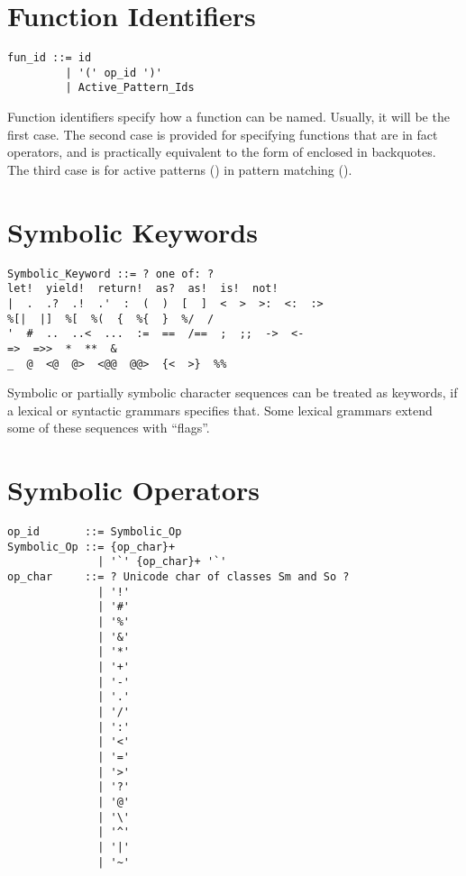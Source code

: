\section{Function Identifiers}
\label{sec:function-identifiers}

\syntax\begin{lstlisting}
fun_id ::= id
         | '(' op_id ')'
         | Active_Pattern_Ids
\end{lstlisting}

Function identifiers specify how a function can be named. Usually, it will be the first case. The second case is provided for specifying functions that are in fact operators, and is practically equivalent to the form of  enclosed in backquotes. The third case is for active patterns () in pattern matching (). 





\section{Symbolic Keywords}
\label{sec:symbolic-keywords}

\syntax\begin{lstlisting}[deletekeywords={of}]
Symbolic_Keyword ::= ? one of: ?
let!  yield!  return!  as?  as!  is!  not!
|  .  .?  .!  .'  :  (  )  [  ]  <  >  >:  <:  :>
%[|  |]  %[  %(  {  %{  }  %/  /
'  #  ..  ..<  ...  :=  ==  /==  ;  ;;  ->  <-
=>  =>>  *  **  &
_  @  <@  @>  <@@  @@>  {<  >}  %%
\end{lstlisting}

Symbolic or partially symbolic character sequences can be treated as keywords, if a lexical or syntactic grammars specifies that. Some lexical grammars extend some of these sequences with ``flags''. 





\section{Symbolic Operators}
\label{sec:symbolic-operators}

\syntax\begin{lstlisting}[deletekeywords={of,and}]
op_id       ::= Symbolic_Op
Symbolic_Op ::= {op_char}+
              | '`' {op_char}+ '`'
op_char     ::= ? Unicode char of classes Sm and So ?
              | '!'
              | '#'
              | '%'
              | '&'
              | '*'
              | '+'
              | '-'
              | '.'
              | '/'
              | ':'
              | '<'
              | '='
              | '>'
              | '?'
              | '@'
              | '\'
              | '^'
              | '|'
              | '~'
\end{lstlisting}


